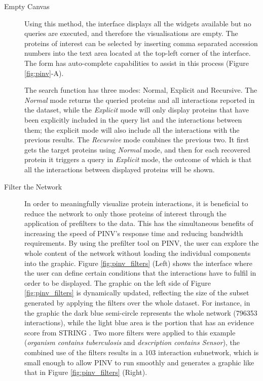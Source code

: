 \begin{description}
\item[Empty Canvas] 
Using this method, the interface displays all the widgets available but no queries are executed, and therefore the visualisations are empty. The proteins of interest can be selected by inserting comma separated accession numbers into the text area located at the top-left corner of the interface. The form has auto-complete capabilities to assist in this process (Figure \ref{fig:pinv}-A). 

The search function has three modes: Normal, Explicit and Recursive. The \emph{Normal} mode returns the queried proteins and all interactions reported in the dataset, while the \emph{Explicit} mode will only display proteins that have been explicitly included in the query list and the interactions between them; the explicit mode will also include all the interactions with the previous results.
The \emph{Recursive} mode combines the previous two. It first gets the target proteins using \emph{Normal} mode, and then for each recovered protein it triggers a query in \emph{Explicit} mode, the outcome of which is that all the interactions between displayed proteins will be shown.

\item[Filter the Network] 
In order to meaningfully visualize protein interactions, it is beneficial to reduce the network to only those proteins of interest through the application of prefilters to the data. This has the simultaneous benefits of increasing the speed of PINV's response time and reducing bandwidth requirements. By using the prefilter tool on PINV, the user can explore the whole content of the network without loading the individual components into the graphic. Figure \ref{fig:pinv_filters} (Left) shows the interface where the user can define certain conditions that the interactions have to fulfil in order to be displayed. The graphic on the left side of Figure \ref{fig:pinv_filters} is dynamically updated, reflecting the size of the subset generated by applying the filters over the whole dataset. For instance, in the graphic the dark blue semi-circle represents the whole network (796353 interactions), while the light blue area is the portion that has an evidence score from STRING \cite{FRA2013}. Two more filters were applied to this example (\emph{organism contains tuberculosis} and \emph{description contains Sensor}), the combined use of the filters results in a 103 interaction subnetwork, which is small enough to allow PINV to run smoothly and generates a graphic like that in Figure \ref{fig:pinv_filters} (Right).


\end{description}
